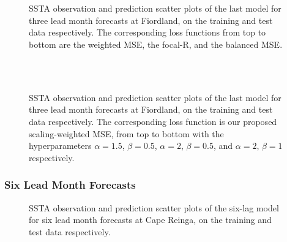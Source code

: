 \documentclass[11pt, a4paper]{article}
\begin{document}
\begin{figure}[H]
\centering
{}
\\
\\
\caption{SSTA observation and prediction scatter plots of the last model for three lead month forecasts at Fiordland, on the training and test data respectively. The corresponding loss functions from top to bottom are the weighted MSE, the focal-R, and the balanced MSE.}
\end{figure}

\begin{figure}[H]
\centering
{}
\\
\\
\caption{SSTA observation and prediction scatter plots of the last model for three lead month forecasts at Fiordland, on the training and test data respectively. The corresponding loss function is our proposed scaling-weighted MSE, from top to bottom with the hyperparameters $\alpha=1.5$, $\beta=0.5$, $\alpha=2$, $\beta=0.5$, and $\alpha=2$, $\beta=1$ respectively.}
\end{figure}

\subsubsection{Six Lead Month Forecasts}

\begin{figure}[H]
\centering
{}
\caption{SSTA observation and prediction scatter plots of the six-lag model for six lead month forecasts at Cape Reinga, on the training and test data respectively.}
\end{figure}
\end{document}
